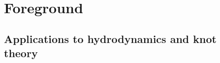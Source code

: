 \documentclass[handout,10pt]{beamer}
\begin{document}
\section{Foreground}
\checkpoint
\subsection{Applications to hydrodynamics and knot theory}
\end{document}
